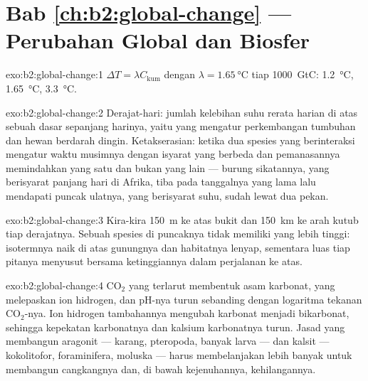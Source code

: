 \section*{Bab \ref{ch:b2:global-change} --- Perubahan Global dan Biosfer}

\begin{solution}{exo:b2:global-change:1}
$\Delta T = \lambda C_{\text{kum}}$ dengan $\lambda = \qty{1.65}{\celsius}$
tiap \qty{1000}{GtC}: \qty{1.2}{\celsius}, \qty{1.65}{\celsius},
\qty{3.3}{\celsius}.
\end{solution}

\begin{solution}{exo:b2:global-change:2}
Derajat-hari: jumlah kelebihan suhu rerata harian di atas sebuah dasar
sepanjang harinya, yaitu  yang mengatur perkembangan
tumbuhan dan hewan berdarah dingin. Ketakserasian: ketika dua spesies
yang berinteraksi mengatur waktu musimnya dengan isyarat yang berbeda
dan pemanasannya memindahkan yang satu dan bukan yang lain --- burung
sikatannya, yang berisyarat panjang hari di Afrika, tiba pada
tanggalnya yang lama lalu mendapati puncak ulatnya, yang berisyarat
suhu, sudah lewat dua pekan.
\end{solution}

\begin{solution}{exo:b2:global-change:3}
Kira-kira \qty{150}{m} ke atas bukit dan \qty{150}{km} ke arah kutub
tiap derajatnya. Sebuah spesies di puncaknya tidak memiliki  yang
lebih tinggi: isotermnya naik di atas gunungnya dan habitatnya lenyap,
sementara luas tiap pitanya menyusut bersama ketinggiannya dalam
perjalanan ke atas.
\end{solution}

\begin{solution}{exo:b2:global-change:4}
\ensuremath{\mathrm{CO_2}} yang terlarut membentuk asam karbonat, yang
melepaskan ion hidrogen, dan pH-nya turun sebanding dengan logaritma
tekanan \ensuremath{\mathrm{CO_2}}-nya. Ion hidrogen tambahannya mengubah
karbonat menjadi bikarbonat, sehingga kepekatan karbonatnya dan  kalsium karbonatnya turun. Jasad yang membangun aragonit ---
karang, pteropoda, banyak larva --- dan kalsit --- kokolitofor,
foraminifera, moluska --- harus membelanjakan lebih banyak untuk
membangun cangkangnya dan, di bawah kejenuhannya, kehilangannya.
\end{solution}


